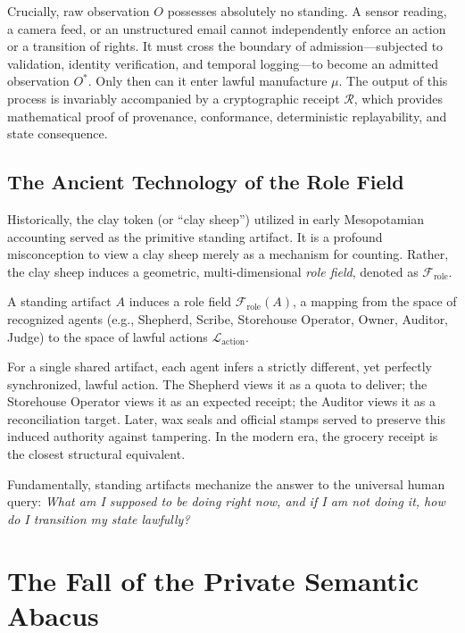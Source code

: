 Crucially, raw observation $O$ possesses absolutely no standing. A sensor reading, a camera feed, or an unstructured email cannot independently enforce an action or a transition of rights. It must cross the boundary of admission—subjected to validation, identity verification, and temporal logging—to become an admitted observation $O^*$. Only then can it enter lawful manufacture $\mu$. The output of this process is invariably accompanied by a cryptographic receipt $\mathcal{R}$, which provides mathematical proof of provenance, conformance, deterministic replayability, and state consequence. 

\subsection{The Ancient Technology of the Role Field}
Historically, the clay token (or ``clay sheep'') utilized in early Mesopotamian accounting served as the primitive standing artifact. It is a profound misconception to view a clay sheep merely as a mechanism for counting. Rather, the clay sheep induces a geometric, multi-dimensional \textit{role field}, denoted as $\mathcal{F}_{\text{role}}$. 

\begin{definition}
A standing artifact $A$ induces a role field $\mathcal{F}_{\text{role}}(A)$, a mapping from the space of recognized agents (e.g., Shepherd, Scribe, Storehouse Operator, Owner, Auditor, Judge) to the space of lawful actions $\mathcal{L}_{\text{action}}$.
\end{definition}

For a single shared artifact, each agent infers a strictly different, yet perfectly synchronized, lawful action. The Shepherd views it as a quota to deliver; the Storehouse Operator views it as an expected receipt; the Auditor views it as a reconciliation target. Later, wax seals and official stamps served to preserve this induced authority against tampering. In the modern era, the grocery receipt is the closest structural equivalent. 

Fundamentally, standing artifacts mechanize the answer to the universal human query: \textit{What am I supposed to be doing right now, and if I am not doing it, how do I transition my state lawfully?}

\section{The Fall of the Private Semantic Abacus}

